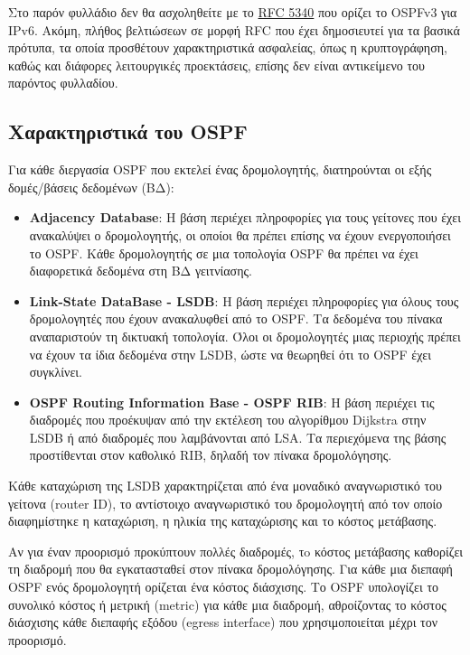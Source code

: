 \documentclass{EdipyLabs} %
\begin{document}
Στο παρόν φυλλάδιο δεν θα ασχοληθείτε με το \href{https://tools.ietf.org/html/rfc5340}{RFC 5340} που ορίζει το OSPFv3 για IPv6. Ακόμη, πλήθος βελτιώσεων σε μορφή RFC που έχει δημοσιευτεί για τα βασικά πρότυπα, τα οποία προσθέτουν χαρακτηριστικά ασφαλείας, όπως η κρυπτογράφηση, καθώς και διάφορες λειτουργικές προεκτάσεις, επίσης δεν είναι αντικείμενο του παρόντος φυλλαδίου. 

\subsection{Χαρακτηριστικά του OSPF}

Για κάθε διεργασία OSPF που εκτελεί ένας δρομολογητής, διατηρούνται οι εξής δομές/βάσεις δεδομένων (ΒΔ):~
\begin{itemize}
	\item \textbf{Adjacency Database}: Η βάση περιέχει πληροφορίες για τους γείτονες που έχει ανακαλύψει ο δρομολογητής, οι οποίοι θα πρέπει επίσης να έχουν ενεργοποιήσει το OSPF. Κάθε δρομολογητής σε μια τοπολογία OSPF θα πρέπει να έχει διαφορετικά δεδομένα στη ΒΔ γειτνίασης. 
	\item \textbf{Link-State DataBase - LSDB}: Η βάση περιέχει πληροφορίες για όλους τους δρομολογητές που έχουν ανακαλυφθεί από το OSPF. Τα δεδομένα του πίνακα αναπαριστούν τη δικτυακή τοπολογία. Όλοι οι δρομολογητές μιας περιοχής πρέπει να έχουν τα ίδια δεδομένα στην LSDB, ώστε να θεωρηθεί ότι το OSPF έχει συγκλίνει.
	\item \textbf{OSPF Routing Information Base - OSPF RIB}: Η βάση περιέχει τις διαδρομές που προέκυψαν από την εκτέλεση του αλγορίθμου Dijkstra στην LSDB ή από διαδρομές που λαμβάνονται από LSA. Τα περιεχόμενα της βάσης προστίθενται στον καθολικό RIB, δηλαδή τον πίνακα δρομολόγησης.
\end{itemize}

Κάθε καταχώριση της LSDB χαρακτηρίζεται από ένα μοναδικό αναγνωριστικό του γείτονα (router ID), το αντίστοιχο αναγνωριστικό του δρομολογητή από τον οποίο διαφημίστηκε η καταχώριση, η ηλικία της καταχώρισης και το κόστος μετάβασης. 

Αν για έναν προορισμό προκύπτουν πολλές διαδρομές, τo κόστος μετάβασης καθορίζει τη διαδρομή που θα εγκατασταθεί στον πίνακα δρομολόγησης. Για κάθε μια διεπαφή OSPF ενός δρομολογητή ορίζεται ένα κόστος διάσχισης. Το OSPF υπολογίζει το συνολικό κόστος ή μετρική (metric) για κάθε μια διαδρομή, αθροίζοντας το κόστος διάσχισης κάθε διεπαφής εξόδου (egress interface) που χρησιμοποιείται μέχρι τον προορισμό.
\end{document}
